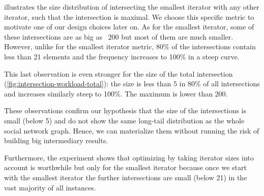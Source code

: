  illustrates the size distribution of intersecting the smallest iterator with any other
iterator, such that the intersection is maximal.
We choose this specific metric to motivate one of our design choices later on.
As for the smallest iterator, some of these intersections are as big as ~200 but most of them are much smaller.
However, unlike for the smallest iterator metric, 80\% of the intersections contain less than 21  elements and the frequency increases to
100\% in a steep curve.

This last observation is even stronger for the size of the total intersection (\cref{fig:intersection-workload-total}):
the size is less than 5 in 80\% of all intersections and increases similarly steep to 100\%.
The maximum is lower than 200.

These observations confirm our hypothesis that the size of the intersections is small (below 5) and do not show the same long-tail
distribution as the whole social network graph.
Hence, we can materialize them without running the risk of building big intermediary results.

Furthermore, the experiment shows that optimizing by taking iterator sizes into account is worthwhile but only for the smallest iterator
because
once we start with the smallest iterator the further intersections are small (below 21) in the vast majority of all instances.


